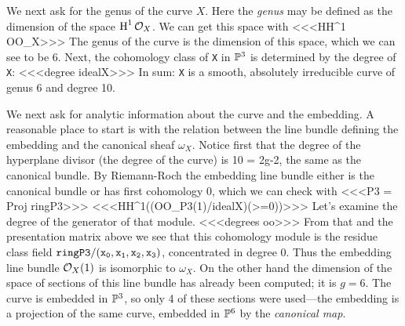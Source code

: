 We next ask for the genus of the curve $X$.
Here the {\it genus} may be defined as the dimension of
the space $\operatorname{H}\nolimits^1\cO_X$. 
We can get this space with
<<<HH^1 OO_X>>>
The genus of the curve is the dimension of this space,
which we can see to be 6.
Next, the cohomology class of {\tt X} in $\P^3$ is determined
by the degree of {\tt X}:
<<<degree idealX>>>
In sum: {\tt X} is a smooth, absolutely irreducible curve of 
genus 6 and degree 10.

We next ask for
analytic information about the curve and the embedding.
A reasonable place to start is
with the relation between the line bundle defining the
embedding and the canonical sheaf $\omega_X$.
Notice first that the degree of the hyperplane divisor (the
degree of the curve) is 10 = 2g-2, the same as the canonical
bundle. By Riemann-Roch the embedding line bundle either is the canonical
bundle or has first cohomology 0, which we can check with
<<<P3 = Proj ringP3>>>
<<<HH^1((OO_P3(1)/idealX)(>=0))>>>
Let's examine the degree of the generator of that module.
<<<degrees oo>>>
From that and the presentation matrix above
we see that this cohomology module is the residue class field
${\tt ringP3/(x_0,x_1,x_2,x_3)}$,
concentrated in degree 0.
Thus the embedding line bundle $\cO_X(1)$
is isomorphic to $\omega_X$. On the other hand
the dimension of the space of sections of this line bundle has already been
computed; it is $g = 6$. The curve is embedded in $\P^3$, so
only 4 of these sections were used---the embedding is a projection
of the same curve,  embedded in  $\P^6$ by the {\it canonical map\/}.

